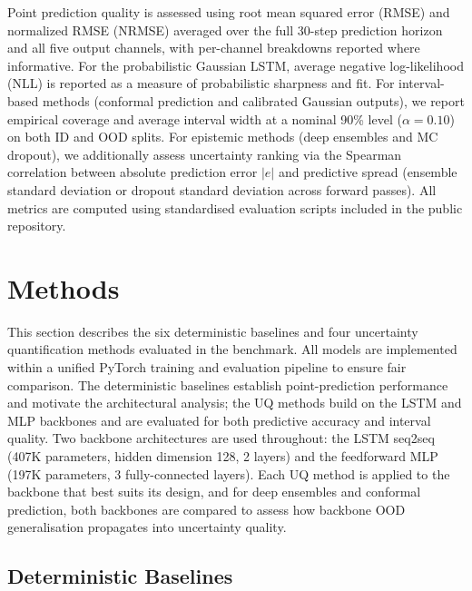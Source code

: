 \documentclass[a4paper,fleqn]{cas-sc}
\begin{document}
Point prediction quality is assessed using root mean squared error (RMSE) and normalized RMSE (NRMSE) averaged over the full 30-step prediction horizon and all five output channels, with per-channel breakdowns reported where informative. For the probabilistic Gaussian LSTM, average negative log-likelihood (NLL) is reported as a measure of probabilistic sharpness and fit. For interval-based methods (conformal prediction and calibrated Gaussian outputs), we report empirical coverage and average interval width at a nominal 90\% level ($\alpha = 0.10$) on both ID and OOD splits. For epistemic methods (deep ensembles and MC dropout), we additionally assess uncertainty ranking via the Spearman correlation between absolute prediction error $|e|$ and predictive spread (ensemble standard deviation or dropout standard deviation across forward passes). All metrics are computed using standardised evaluation scripts included in the public repository.

\section{Methods}

This section describes the six deterministic baselines and four uncertainty quantification methods evaluated in the benchmark. All models are implemented within a unified PyTorch training and evaluation pipeline to ensure fair comparison. The deterministic baselines establish point-prediction performance and motivate the architectural analysis; the UQ methods build on the LSTM and MLP backbones and are evaluated for both predictive accuracy and interval quality. Two backbone architectures are used throughout: the LSTM seq2seq (407K parameters, hidden dimension 128, 2 layers) and the feedforward MLP (197K parameters, 3 fully-connected layers). Each UQ method is applied to the backbone that best suits its design, and for deep ensembles and conformal prediction, both backbones are compared to assess how backbone OOD generalisation propagates into uncertainty quality.

\subsection{Deterministic Baselines}
\end{document}
